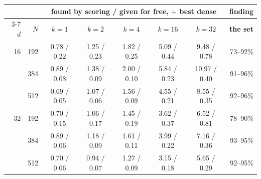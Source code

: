 \begin{tabular}{rr ccccc r}
\toprule
& & \multicolumn{5}{c}{\textbf{found by scoring / given for free}, $\div$ best dense} & \textbf{finding} \\
\cmidrule(lr){3-7}
$d$ & $N$ & $k{=}1$ & $k{=}2$ & $k{=}4$ & $k{=}16$ & $k{=}32$ & \textbf{the set} \\
\midrule
16 & 192 & 0.78 / 0.22 & 1.25 / 0.23 & 1.82 / 0.25 & 5.09 / 0.44 & 9.48 / 0.78 & 73--92\% \\
 & 384 & 0.89 / 0.08 & 1.38 / 0.09 & 2.00 / 0.10 & 5.84 / 0.23 & 10.97 / 0.40 & 91--96\% \\
 & 512 & 0.69 / 0.05 & 1.07 / 0.06 & 1.56 / 0.09 & 4.55 / 0.21 & 8.55 / 0.35 & 92--96\% \\
\midrule
32 & 192 & 0.70 / 0.15 & 1.06 / 0.17 & 1.45 / 0.19 & 3.62 / 0.37 & 6.52 / 0.81 & 78--90\% \\
 & 384 & 0.89 / 0.06 & 1.18 / 0.09 & 1.61 / 0.11 & 3.99 / 0.22 & 7.16 / 0.36 & 93--95\% \\
 & 512 & 0.70 / 0.06 & 0.94 / 0.07 & 1.27 / 0.09 & 3.15 / 0.18 & 5.65 / 0.29 & 92--95\% \\
\bottomrule
\end{tabular}%
